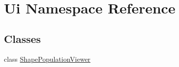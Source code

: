 \hypertarget{namespace_ui}{\section{Ui Namespace Reference}
\label{namespace_ui}
}
\subsection*{Classes}
\begin{DoxyCompactItemize}
\item 
class \hyperlink{class_ui_1_1_shape_population_viewer}{Shape\-Population\-Viewer}
\end{DoxyCompactItemize}
